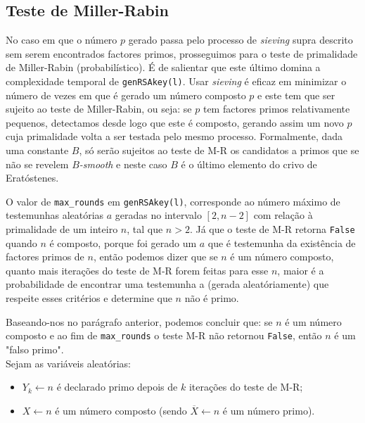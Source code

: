 \documentclass[dvipsnames]{article}
\begin{document}
\begin{multicols}{2}
  \subsection{Teste de Miller-Rabin}
  
  No caso em que o número $p$ gerado passa pelo processo de \textit{sieving} supra descrito sem serem encontrados factores primos, prosseguimos para o teste de primalidade de Miller-Rabin (probabilístico). É de salientar que este último domina a complexidade temporal de \texttt{genRSAkey(l)}. Usar \textit{sieving} é eficaz em minimizar o número de vezes em que é gerado um número composto $p$ e este tem que ser sujeito ao teste de Miller-Rabin, ou seja: se $p$ tem factores primos relativamente pequenos, detectamos desde logo que este é composto, gerando assim um novo $p$ cuja primalidade volta a ser testada pelo mesmo processo. Formalmente, dada uma constante $B$, só serão sujeitos ao teste de M-R os candidatos a primos que se não se revelem $B$\textit{-smooth} \cite{DBLP:journals/dcc/Lenstra00} e neste caso $B$ é o último elemento do crivo de Eratóstenes.
  
  \vskip 0.4cm
  
  \noindent O valor de \texttt{max\_rounds} em \texttt{genRSAkey(l)}, corresponde ao número máximo de testemunhas aleatórias $a$ geradas no intervalo $[2,n-2]$ com relação à primalidade de um inteiro $n$, tal que $n>2$. Já que o teste de M-R retorna \texttt{False} quando $n$ é composto, porque foi gerado um $a$ que é testemunha da existência de factores primos de $n$, então podemos dizer que se $n$ é um número composto, quanto mais iterações do teste de M-R forem feitas para esse $n$, maior é a probabilidade de encontrar uma testemunha a (gerada aleatóriamente) que respeite esses critérios e determine que $n$ não é primo.
  
  \vskip 0.4cm
  
  \noindent Baseando-nos no parágrafo anterior, podemos concluir que: se $n$ é um número composto e ao fim de \texttt{max\_rounds} o teste M-R não retornou \texttt{False}, então $n$ é um "falso primo".\\
  
  \noindent Sejam as variáveis aleatórias:
  
  \begin{itemize}
    \item $Y_k \leftarrow n$ é declarado primo depois de $k$ iterações do teste de M-R;
    \item $X \leftarrow n$ é um número composto (sendo $\overline{X} \leftarrow n$ é um número primo).
  \end{itemize}
  

\end{multicols}
\end{document}
